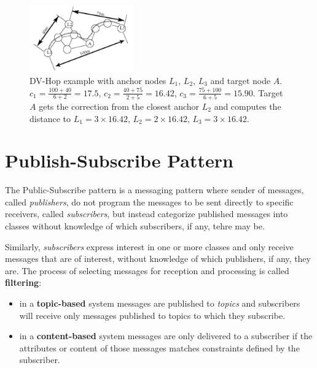 \documentclass[a4paper,12pt]{article}
\begin{document}
\begin{enumerate}[label=(\alph*)]
\begin{enumerate}[label=(\roman*)]
    \begin{figure}[t]
      \centering
      \includegraphics[width=0.4\textwidth]{img/dv-hop}
      \caption{\label{fig:dv-hop}DV-Hop example with anchor nodes $L_1$, $L_2$, $L_3$ and target node $A$. $c_1 = \frac{100+40}{6+2} = 17.5$, $c_2 = \frac{40+75}{2+5} = 16.42$, $c_3 = \frac{75+100}{6+5} = 15.90$. Target $A$ gets the correction from the closest anchor $L_2$ and computes the distance to $L_1 = 3 \times 16.42$, $L_2 = 2 \times 16.42$, $L_3 = 3 \times 16.42$.}
    \end{figure}
  \end{enumerate}
\end{enumerate}

\clearpage

\section{Publish-Subscribe Pattern}
The Public-Subscribe pattern is a messaging pattern where sender of messages, called \textit{publishers}, do not program the messages to be sent directly to specific receivers, called \textit{subscribers}, but instead categorize published messages into classes without knowledge of which subscribers, if any, tehre may be.

Similarly, \textit{subscribers} express interest in one or more classes and only receive messages that are of interest, without knowledge of which publishers, if any, they are. The process of selecting messages for reception and processing is called \textbf{filtering}:
\begin{itemize}
  \item in a \textbf{topic-based} system messages are published to \textit{topics} and subscribers will receive only messages published to topics to which they subscribe.
  \item in a \textbf{content-based} system messages are only delivered to a subscriber if the attributes or content of those messages matches constraints defined by the subscriber.
\end{itemize}
\end{document}
